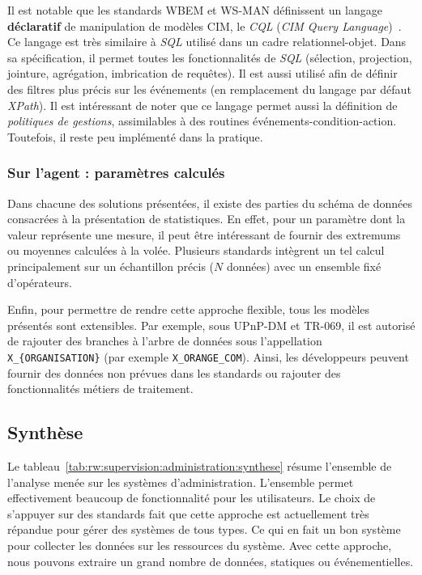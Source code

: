 Il est notable que les standards WBEM et WS-MAN définissent un langage \textbf{déclaratif} de manipulation de modèles CIM, le \textit{CQL} (\textit{CIM Query Language})~\cite{DMTF:CIM-QL}. Ce langage est très similaire à \textit{SQL} utilisé dans un cadre relationnel-objet. Dans sa spécification, il permet toutes les fonctionnalités de \textit{SQL} (sélection, projection, jointure, agrégation, imbrication de requêtes). Il est aussi utilisé afin de définir des filtres plus précis sur les événements (en remplacement du langage par défaut \textit{XPath}). Il est intéressant de noter que ce langage permet aussi la définition de \textit{politiques de gestions}, assimilables à des routines événements-condition-action. Toutefois, il reste peu implémenté dans la pratique.

\subsubsection{Sur l'agent : paramètres calculés}
Dans chacune des solutions présentées, il existe des parties du schéma de données consacrées à la présentation de statistiques. En effet, pour un paramètre dont la valeur représente une mesure, il peut être intéressant de fournir des extremums ou moyennes calculées à la volée. Plusieurs standards intègrent un tel calcul principalement sur un échantillon précis ($N$ données) avec un ensemble fixé d'opérateurs.

Enfin, pour permettre de rendre cette approche flexible, tous les modèles présentés sont extensibles. Par exemple, sous UPnP-DM et TR-069, il est autorisé de rajouter des branches à l'arbre de données sous l'appellation \verb|X_{ORGANISATION}| (par exemple \verb|X_ORANGE_COM|). Ainsi, les développeurs peuvent fournir des données non prévues dans les standards ou rajouter des fonctionnalités métiers de traitement.

\subsection{Synthèse}
Le tableau~\ref{tab:rw:supervision:administration:synthese} résume l'ensemble de l'analyse menée sur les systèmes d'administration. L'ensemble permet effectivement beaucoup de fonctionnalité pour les utilisateurs. Le choix de s'appuyer sur des standards fait que cette approche est actuellement très répandue pour gérer des systèmes de tous types. Ce qui en fait un bon système pour collecter les données sur les ressources du système. Avec cette approche, nous pouvons extraire un grand nombre de données, statiques ou événementielles.

